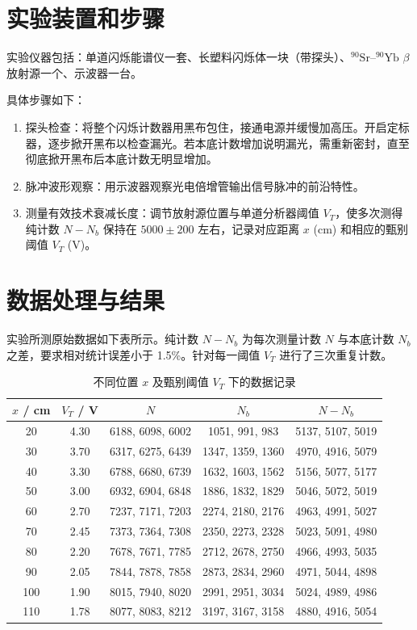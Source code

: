 \documentclass[12pt,a4paper]{article}
\begin{document}
\section{实验装置和步骤}
实验仪器包括：单道闪烁能谱仪一套、长塑料闪烁体一块（带探头）、$^{90}\mathrm{Sr}\text{--}^{90}\mathrm{Yb}$ $\beta$ 放射源一个、示波器一台。

具体步骤如下：
\begin{enumerate}
    \item 探头检查：将整个闪烁计数器用黑布包住，接通电源并缓慢加高压。开启定标器，逐步掀开黑布以检查漏光。若本底计数增加说明漏光，需重新密封，直至彻底掀开黑布后本底计数无明显增加。
    \item 脉冲波形观察：用示波器观察光电倍增管输出信号脉冲的前沿特性。
    \item 测量有效技术衰减长度：调节放射源位置与单道分析器阈值 $V_T$，使多次测得纯计数 $N - N_b$ 保持在 $5000\pm200$ 左右，记录对应距离 $x$ (\unit{\centi\meter}) 和相应的甄别阈值 $V_T$ (\unit{\volt})。
\end{enumerate}

\section{数据处理与结果}
实验所测原始数据如下表所示。纯计数 $N - N_b$ 为每次测量计数 $N$ 与本底计数 $N_b$ 之差，要求相对统计误差小于 1.5\%。针对每一阈值 $V_T$ 进行了三次重复计数。

\begin{table}[htbp]
\centering
\caption{不同位置 $x$ 及甄别阈值 $V_T$ 下的数据记录}
\begin{tabular}{ccccc}
\toprule
$x$ / \unit{\centi\meter} & $V_T$ / \unit{\volt} & $N$ & $N_b$ & $N-N_b$ \\
\midrule
20 & 4.30 & 6188, 6098, 6002 & 1051, 991, 983 & 5137, 5107, 5019 \\
30 & 3.70 & 6317, 6275, 6439 & 1347, 1359, 1360 & 4970, 4916, 5079 \\
40 & 3.30 & 6788, 6680, 6739 & 1632, 1603, 1562 & 5156, 5077, 5177 \\
50 & 3.00 & 6932, 6904, 6848 & 1886, 1832, 1829 & 5046, 5072, 5019 \\
60 & 2.70 & 7237, 7171, 7203 & 2274, 2180, 2176 & 4963, 4991, 5027 \\
70 & 2.45 & 7373, 7364, 7308 & 2350, 2273, 2328 & 5023, 5091, 4980 \\
80 & 2.20 & 7678, 7671, 7785 & 2712, 2678, 2750 & 4966, 4993, 5035 \\
90 & 2.05 & 7844, 7878, 7858 & 2873, 2834, 2960 & 4971, 5044, 4898 \\
100 & 1.90 & 8015, 7940, 8020 & 2991, 2951, 3034 & 5024, 4989, 4986 \\
110 & 1.78 & 8077, 8083, 8212 & 3197, 3167, 3158 & 4880, 4916, 5054 \\
\bottomrule
\end{tabular}
\end{table}
\end{document}
